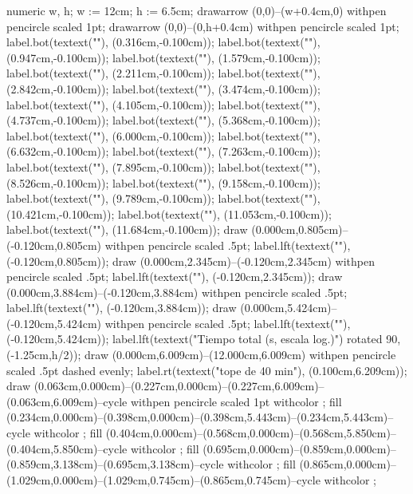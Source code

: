 {\startMPcode
numeric w, h; w := 12cm; h := 6.5cm;
drawarrow (0,0)--(w+0.4cm,0) withpen pencircle scaled 1pt;
drawarrow (0,0)--(0,h+0.4cm) withpen pencircle scaled 1pt;
label.bot(textext(""), (0.316cm,-0.100cm));
label.bot(textext(""), (0.947cm,-0.100cm));
label.bot(textext(""), (1.579cm,-0.100cm));
label.bot(textext(""), (2.211cm,-0.100cm));
label.bot(textext(""), (2.842cm,-0.100cm));
label.bot(textext(""), (3.474cm,-0.100cm));
label.bot(textext(""), (4.105cm,-0.100cm));
label.bot(textext(""), (4.737cm,-0.100cm));
label.bot(textext(""), (5.368cm,-0.100cm));
label.bot(textext(""), (6.000cm,-0.100cm));
label.bot(textext(""), (6.632cm,-0.100cm));
label.bot(textext(""), (7.263cm,-0.100cm));
label.bot(textext(""), (7.895cm,-0.100cm));
label.bot(textext(""), (8.526cm,-0.100cm));
label.bot(textext(""), (9.158cm,-0.100cm));
label.bot(textext(""), (9.789cm,-0.100cm));
label.bot(textext(""), (10.421cm,-0.100cm));
label.bot(textext(""), (11.053cm,-0.100cm));
label.bot(textext(""), (11.684cm,-0.100cm));
draw (0.000cm,0.805cm)--(-0.120cm,0.805cm) withpen pencircle scaled .5pt;
label.lft(textext(""), (-0.120cm,0.805cm));
draw (0.000cm,2.345cm)--(-0.120cm,2.345cm) withpen pencircle scaled .5pt;
label.lft(textext(""), (-0.120cm,2.345cm));
draw (0.000cm,3.884cm)--(-0.120cm,3.884cm) withpen pencircle scaled .5pt;
label.lft(textext(""), (-0.120cm,3.884cm));
draw (0.000cm,5.424cm)--(-0.120cm,5.424cm) withpen pencircle scaled .5pt;
label.lft(textext(""), (-0.120cm,5.424cm));
label.lft(textext("Tiempo total (s, escala log.)") rotated 90, (-1.25cm,h/2));
draw (0.000cm,6.009cm)--(12.000cm,6.009cm) withpen pencircle scaled .5pt dashed evenly;
label.rt(textext("\tfxx tope de 40 min"), (0.100cm,6.209cm));
draw (0.063cm,0.000cm)--(0.227cm,0.000cm)--(0.227cm,6.009cm)--(0.063cm,6.009cm)--cycle withpen pencircle scaled 1pt withcolor ;
fill (0.234cm,0.000cm)--(0.398cm,0.000cm)--(0.398cm,5.443cm)--(0.234cm,5.443cm)--cycle withcolor ;
fill (0.404cm,0.000cm)--(0.568cm,0.000cm)--(0.568cm,5.850cm)--(0.404cm,5.850cm)--cycle withcolor ;
fill (0.695cm,0.000cm)--(0.859cm,0.000cm)--(0.859cm,3.138cm)--(0.695cm,3.138cm)--cycle withcolor ;
fill (0.865cm,0.000cm)--(1.029cm,0.000cm)--(1.029cm,0.745cm)--(0.865cm,0.745cm)--cycle withcolor ;
}
